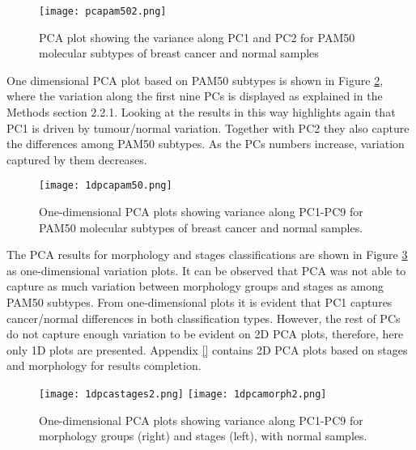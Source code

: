             \begin{figure}[!h]
            \centering
            \texttt{[image: pcapam502.png]} 
            \caption{PCA plot showing the variance along PC1 and PC2 for PAM50 molecular subtypes of breast cancer and normal samples}
            \label{fig:pcapam50}
            \end{figure}
            
    \newpage
    One dimensional PCA plot based on PAM50 subtypes is shown in Figure \ref{fig:1dpcapam50}, where the variation along the first nine PCs is displayed as explained in the Methods section 2.2.1. Looking at the results in this way highlights again that PC1 is driven by tumour/normal variation. Together with PC2 they also capture the differences among PAM50 subtypes. As the PCs numbers increase, variation captured by them decreases. 
    
            \begin{figure}[!h]
            \centering
            \texttt{[image: 1dpcapam50.png]}
            \caption{One-dimensional PCA plots showing variance along PC1-PC9 for PAM50 molecular subtypes of breast cancer and normal samples. }
            \label{fig:1dpcapam50}
            \end{figure}
    
    
    The PCA results for morphology and stages classifications are shown in Figure \ref{fig:1dpcamorphstage} as one-dimensional variation plots. It can be observed that PCA was not able to capture as much variation between morphology groups and stages as among PAM50 subtypes. From one-dimensional plots it is evident that PC1 captures cancer/normal differences in both classification types. However, the rest of PCs do not capture enough variation to be evident on 2D PCA plots, therefore, here only 1D plots are presented. Appendix \ref{} contains 2D PCA plots based on stages and morphology for results completion.    
    
            
            \begin{figure}[!h]
            \texttt{[image: 1dpcastages2.png]}\hfill
            \texttt{[image: 1dpcamorph2.png]}
            \caption{One-dimensional PCA plots showing variance along PC1-PC9 for morphology groups (right) and stages (left), with normal samples.}
            \label{fig:1dpcamorphstage}
            \end{figure}
            
